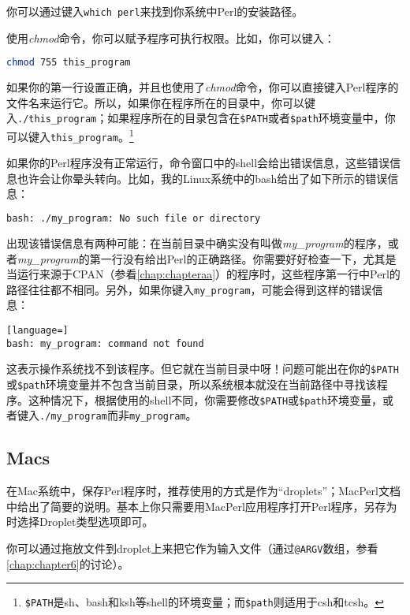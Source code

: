 你可以通过键入\verb|which perl|来找到你系统中Perl的安装路径。

使用\textit{chmod}命令，你可以赋予程序可执行权限。比如，你可以键入：

\begin{lstlisting}[language=bash]
chmod 755 this_program
\end{lstlisting}

如果你的第一行设置正确，并且也使用了\textit{chmod}命令，你可以直接键入Perl程序的文件名来运行它。所以，如果你在程序所在的目录中，你可以键入\verb|./this_program|；如果程序所在的目录包含在\verb|$PATH|或者\verb|$path|环境变量中，你可以键入\verb|this_program|。\footnote{\verb|$PATH|是sh、bash和ksh等shell的环境变量；而\verb|$path|则适用于csh和tcsh。}

如果你的Perl程序没有正常运行，命令窗口中的shell会给出错误信息，这些错误信息也许会让你晕头转向。比如，我的Linux系统中的bash给出了如下所示的错误信息：

\begin{lstlisting}[language=bash]
bash: ./my_program: No such file or directory
\end{lstlisting}

出现该错误信息有两种可能：在当前目录中确实没有叫做\textit{my\_program}的程序，或者\textit{my\_program}的第一行没有给出Perl的正确路径。你需要好好检查一下，尤其是当运行来源于CPAN（参看\autoref{chap:chapteraa}）的程序时，这些程序第一行中Perl的路径往往都不相同。另外，如果你键入\verb|my_program|，可能会得到这样的错误信息：

\begin{lstlisting}[language=]
bash: my_program: command not found
\end{lstlisting}

这表示操作系统找不到该程序。但它就在当前目录中呀！问题可能出在你的\verb|$PATH|或\verb|$path|环境变量并不包含当前目录，所以系统根本就没在当前路径中寻找该程序。这种情况下，根据使用的shell不同，你需要修改\verb|$PATH|或\verb|$path|环境变量，或者键入\verb|./my_program|而非\verb|my_program|。

\subsection{Macs}
在Mac系统中，保存Perl程序时，推荐使用的方式是作为“droplets”；MacPerl文档中给出了简要的说明。基本上你只需要用MacPerl应用程序打开Perl程序，另存为时选择Droplet类型选项即可。

你可以通过拖放文件到droplet上来把它作为输入文件（通过\verb|@ARGV|数组，参看\autoref{chap:chapter6}的讨论）。

